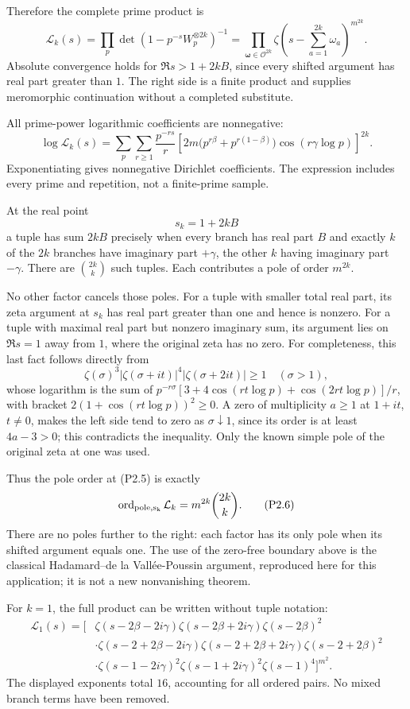 Therefore the complete prime product is \[
\boxed{\displaystyle
\mathcal L_k(s)=
\prod_p\det(1-p^{-s}W_p^{\otimes2k})^{-1}
=
\prod_{\boldsymbol\omega\in\mathcal O^{2k}}
\zeta\!\left(s-\sum_{a=1}^{2k}\omega_a\right)^{m^{2k}}.}
\tag{P2.3}
\] Absolute convergence holds for \(\Re s>1+2kB\), since every shifted
argument has real part greater than \(1\). The right side is a finite
product and supplies meromorphic continuation without a completed
substitute.

All prime-power logarithmic coefficients are nonnegative: \[
\log\mathcal L_k(s)
=\sum_p\sum_{r\ge1}\frac{p^{-rs}}r
\left[
2m\bigl(p^{r\beta}+p^{r(1-\beta)}\bigr)
\cos(r\gamma\log p)
\right]^{2k}.
\tag{P2.4}
\] Exponentiating gives nonnegative Dirichlet coefficients. The
expression includes every prime and repetition, not a finite-prime
sample.

At the real point \[
s_k=1+2kB
\tag{P2.5}
\] a tuple has sum \(2kB\) precisely when every branch has real part
\(B\) and exactly \(k\) of the \(2k\) branches have imaginary part
\(+\gamma\), the other \(k\) having imaginary part \(-\gamma\). There
are \(\binom{2k}{k}\) such tuples. Each contributes a pole of order
\(m^{2k}\).

No other factor cancels those poles. For a tuple with smaller total real
part, its zeta argument at \(s_k\) has real part greater than one and
hence is nonzero. For a tuple with maximal real part but nonzero
imaginary sum, its argument lies on \(\Re s=1\) away from \(1\), where
the original zeta has no zero. For completeness, this last fact follows
directly from \[
\zeta(\sigma)^3|\zeta(\sigma+it)|^4|\zeta(\sigma+2it)|\ge1
\quad(\sigma>1),
\] whose logarithm is the sum of
\(p^{-r\sigma}[3+4\cos(rt\log p)+\cos(2rt\log p)]/r\), with bracket
\(2(1+\cos(rt\log p))^2\ge0\). A zero of multiplicity \(a\ge1\) at
\(1+it\), \(t\ne0\), makes the left side tend to zero as
\(\sigma\downarrow1\), since its order is at least \(4a-3>0\); this
contradicts the inequality. Only the known simple pole of the original
zeta at one was used.

Thus the pole order at (P2.5) is exactly \[
\operatorname{ord}_{\rm pole,s_k}\mathcal L_k
=m^{2k}\binom{2k}{k}.
\tag{P2.6}
\] There are no poles further to the right: each factor has its only
pole when its shifted argument equals one. The use of the zero-free
boundary above is the classical Hadamard--de la Vallée-Poussin argument,
reproduced here for this application; it is not a new nonvanishing
theorem.

For \(k=1\), the full product can be written without tuple notation: \[
\begin{aligned}
\mathcal L_1(s)=\bigl[&
\zeta(s-2\beta-2i\gamma)\zeta(s-2\beta+2i\gamma)
\zeta(s-2\beta)^2\\
&\cdot\zeta(s-2+2\beta-2i\gamma)
\zeta(s-2+2\beta+2i\gamma)\zeta(s-2+2\beta)^2\\
&\cdot\zeta(s-1-2i\gamma)^2\zeta(s-1+2i\gamma)^2
\zeta(s-1)^4\bigr]^{m^2}.
\end{aligned}
\tag{P2.6a}
\] The displayed exponents total \(16\), accounting for all ordered
pairs. No mixed branch terms have been removed.

